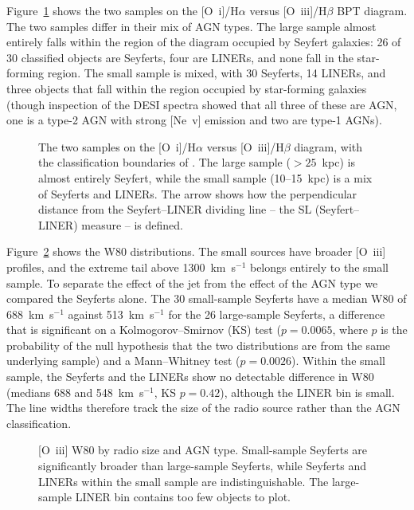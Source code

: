 \documentclass[linenumbers,trackchanges]{aastex701}
\begin{document}
Figure~\ref{fig:bpt} shows the two samples on the [O~{\sc i}]/H$\alpha$ versus [O~{\sc iii}]/H$\beta$ BPT diagram. The two samples differ in their mix of AGN types. The large sample almost entirely falls within the region of the diagram occupied by Seyfert galaxies: 26 of 30 classified objects are Seyferts, four are LINERs, and none fall in the star-forming region. The small sample is mixed, with 30 Seyferts, 14 LINERs, and three objects that fall within the region occupied by star-forming galaxies (though inspection of the DESI spectra showed that all three of these are AGN, one is a type-2 AGN with strong [Ne~{\sc v}] emission and two are type-1 AGNs). 


\begin{figure}
\caption{The two samples on the [O~{\sc i}]/H$\alpha$ versus [O~{\sc iii}]/H$\beta$ diagram, with the classification boundaries of \citet{kewley2006}. The large sample ($>25$~kpc) is almost entirely Seyfert, while the small sample (10--15~kpc) is a mix of Seyferts and LINERs. The arrow shows how the perpendicular distance from the Seyfert--LINER dividing line -- the SL (Seyfert--LINER) measure -- is defined.}
\label{fig:bpt}
\end{figure}
Figure~\ref{fig:w80} shows the W80 distributions. The small sources have broader [O~{\sc iii}] profiles, and the extreme tail above 1300~km~s$^{-1}$ belongs entirely to the small sample. To separate the effect of the jet from the effect of the AGN type we compared the Seyferts alone. The 30 small-sample Seyferts have a median W80 of 688~km~s$^{-1}$ against 513~km~s$^{-1}$ for the 26 large-sample Seyferts, a difference that is significant on a Kolmogorov--Smirnov (KS) test ($p = 0.0065$, where $p$ is the probability of the null hypothesis that the two distributions are from the same underlying sample) and a Mann--Whitney test ($p = 0.0026$). Within the small sample, the Seyferts and the LINERs show no detectable difference in W80 (medians 688 and 548~km~s$^{-1}$, KS $p = 0.42$), although the LINER bin is small. The line widths therefore track the size of the radio source rather than the AGN classification.

\begin{figure}
\caption{[O~{\sc iii}] W80 by radio size and AGN type. Small-sample Seyferts are significantly broader than large-sample Seyferts, while Seyferts and LINERs within the small sample are indistinguishable. The large-sample LINER bin contains too few objects to plot.}
\label{fig:w80}
\end{figure}
\end{document}
